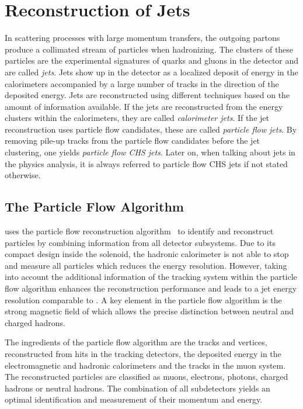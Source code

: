 
\chapter{Reconstruction of Jets}
\label{sec:jet_reconstruction}

In scattering processes with large momentum transfers, the outgoing partons
produce a collimated stream of particles when hadronizing. The clusters of these
particles are the experimental signatures of quarks and gluons in the detector
and are called \emph{jets}. Jets show up in the \CMS detector as a localized
deposit of energy in the calorimeters accompanied by a large number of tracks in
the direction of the deposited energy. Jets are reconstructed using different
techniques based on the amount of information available. If the jets are
reconstructed from the energy clusters within the calorimeters, they are called
\emph{calorimeter jets}. If the jet reconstruction uses particle flow
candidates, these are called \emph{particle flow jets}. By removing pile-up
tracks from the particle flow candidates before the jet clustering, one yields
\emph{particle flow CHS jets}. Later on, when talking about jets in the physics
analysis, it is always referred to particle flow CHS jets if not stated otherwise.

\section{The Particle Flow Algorithm}
\label{sec:particle_flow_algorithm}

\CMS uses the particle flow reconstruction
algorithm~\cite{CMS-PAS-PFT-09-001,CMS-PAS-PFT-10-001} to identify and
reconstruct particles by combining information from all detector
subsystems. Due to its compact design inside the solenoid, the hadronic
calorimeter is not able to stop and measure all particles which reduces the
energy resolution. However, taking into account the additional information of
the tracking system within the particle flow algorithm enhances the
reconstruction performance and leads to a jet energy resolution comparable to
\ATLAS. A key element in the particle flow algorithm is the strong magnetic field
of \CMS which allows the precise distinction between neutral and charged hadrons. 

The ingredients of the particle flow algorithm are the
tracks and vertices, reconstructed from hits in the tracking detectors, the
deposited energy in the electromagnetic and hadronic calorimeters and the tracks
in the muon system. The reconstructed particles are classified as muons,
electrons, photons, charged hadrons or neutral hadrons. The combination of all
subdetectors yields an optimal identification and  measurement of their momentum
and energy.


